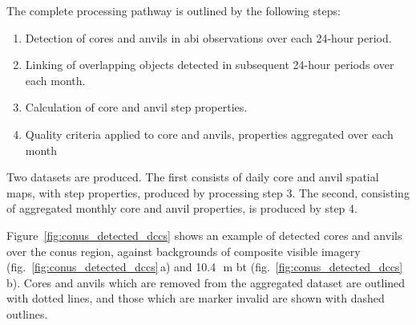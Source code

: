 The complete processing pathway is outlined by the following steps:

\begin{enumerate}
    \item Detection of cores and anvils in \acrshort{abi} observations over each 24-hour period.
    \item Linking of overlapping objects detected in subsequent 24-hour periods over each month.
    \item Calculation of core and anvil step properties. 
    \item Quality criteria applied to core and anvils, properties aggregated over each month
\end{enumerate}

Two datasets are produced. The first consists of daily core and anvil spatial maps, with step properties, produced by processing step 3. 
The second, consisting of aggregated monthly core and anvil properties, is produced by step 4.

Figure~\ref{fig:conus_detected_dccs} shows an example of detected cores and anvils over the \acrshort{conus} region, against backgrounds of composite visible imagery (fig.~\ref{fig:conus_detected_dccs}\,a) and 10.4\,\unit{\mu m} \acrshort{bt} (fig.~\ref{fig:conus_detected_dccs}\,b).
Cores and anvils which are removed from the aggregated dataset are outlined with dotted lines, and those which are marker invalid are shown with dashed outlines.

